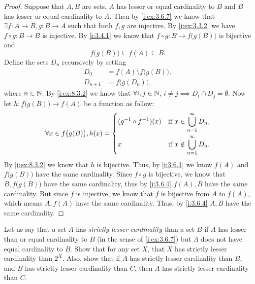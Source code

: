 \begin{proof}
  Suppose that \(A, B\) are sets, \(A\) has lesser or equal cardinality to \(B\) and \(B\) has lesser or equal cardinality to \(A\).
  Then by \cref{i:ex:3.6.7} we know that \(\exists f : A \to B, g : B \to A\) such that both \(f, g\) are injective.
  By \cref{i:ex:3.3.2} we have \(f \circ g : B \to B\) is injective.
  By \cref{i:3.4.1} we know that \(f \circ g : B \to f\big(g(B)\big)\) is bijective and
  \[
    f\big(g(B)\big) \subseteq f(A) \subseteq B.
  \]
  Define the sets \(D_n\) recursively by setting
  \begin{align*}
    D_0       & = f(A) \setminus f\big(g(B)\big), \\
    D_{n + 1} & = f\big(g(D_n)\big),
  \end{align*}
  where \(n \in \mathbb{N}\).
  By \cref{i:ex:8.3.2} we know that \(\forall i, j \in \mathbb{N}\), \(i \neq j \implies D_i \cap D_j = \emptyset\).
  Now let \(h : f\big(g(B)\big) \to f(A)\) be a function as follow:
  \[
    \forall x \in f\big(g(B)\big), h(x) = \begin{dcases}
      (g^{-1} \circ f^{-1})(x) & \text{if } x \in \bigcup_{n = 1}^\infty D_n,    \\
      x                        & \text{if } x \notin \bigcup_{n = 1}^\infty D_n.
    \end{dcases}
  \]
  By \cref{i:ex:8.3.2} we know that \(h\) is bijective.
  Thus, by \cref{i:3.6.1} we know \(f(A)\) and \(f\big(g(B)\big)\) have the same cardinality.
  Since \(f \circ g\) is bijective, we know that \(B, f\big(g(B)\big)\) have the same cardinality, thus by \cref{i:3.6.4} \(f(A), B\) have the same cardinality.
  But since \(f\) is injective, we know that \(f\) is bijective from \(A\) to \(f(A)\), which means \(A, f(A)\) have the same cardinality.
  Thus, by \cref{i:3.6.4} \(A, B\) have the same cardinality.
\end{proof}

\begin{ex}\label{i:ex:8.3.4}
  Let us say that a set \(A\) has \emph{strictly lesser cardinality} than a set \(B\) if \(A\) has lesser than or equal cardinality to \(B\) (in the sense of \cref{i:ex:3.6.7}) but \(A\) does not have equal cardinality to \(B\).
  Show that for any set \(X\), that \(X\) has strictly lesser cardinality than \(2^X\).
  Also, show that if \(A\) has strictly lesser cardinality than \(B\), and \(B\) has strictly lesser cardinality than \(C\), then \(A\) has strictly lesser cardinality than \(C\).
\end{ex}

